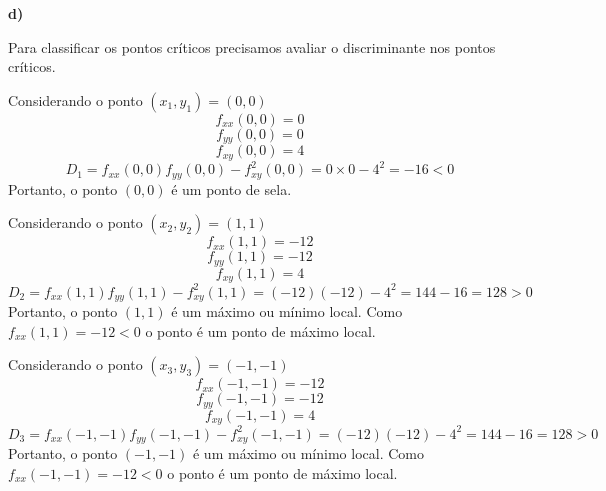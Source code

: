\documentclass[a4paper,12pt,fleqn]{article}
\begin{document}
\begin{answer}
  \noindent\textbf{d)}

  Para classificar os pontos críticos precisamos avaliar o discriminante nos
  pontos críticos.

  Considerando o ponto \((x_1, y_1) = (0, 0)\)
  \[
    f_{xx}(0, 0) = 0
  \]
  \[
    f_{yy}(0, 0) = 0
  \]
  \[
    f_{xy}(0, 0) = 4
  \]
  \[
    D_1
    = f_{xx}(0, 0)f_{yy}(0, 0) - f^2_{xy}(0, 0)
    = 0 \times 0 - 4^2
    = -16 < 0
  \]
  Portanto, o ponto $(0, 0)$ é um ponto de sela.

  Considerando o ponto \((x_2, y_2) = (1, 1)\)
  \[
    f_{xx}(1, 1) = -12
  \]
  \[
    f_{yy}(1, 1) = -12
  \]
  \[
    f_{xy}(1, 1) = 4
  \]
  \[
    D_2
    = f_{xx}(1, 1)f_{yy}(1, 1) - f^2_{xy}(1, 1)
    = (-12)(-12) - 4^2
    = 144 -16
    = 128 > 0
  \]
  Portanto, o ponto $(1, 1)$ é um máximo ou mínimo local. Como \(f_{xx}(1, 1) = -12 < 0\)
  o ponto é um ponto de máximo local.

  Considerando o ponto \((x_3, y_3) = (-1, -1)\)
  \[
    f_{xx}(-1, -1) = -12
  \]
  \[
    f_{yy}(-1, -1) = -12
  \]
  \[
    f_{xy}(-1, -1) = 4
  \]
  \[
    D_3
    = f_{xx}(-1, -1)f_{yy}(-1, -1) - f^2_{xy}(-1, -1)
    = (-12)(-12) - 4^2
    = 144 -16
    = 128 > 0
  \]
  Portanto, o ponto $(-1, -1)$ é um máximo ou mínimo local. Como \(f_{xx}(-1, -1) = -12 < 0\)
  o ponto é um ponto de máximo local.
\end{answer}

\end{document}

